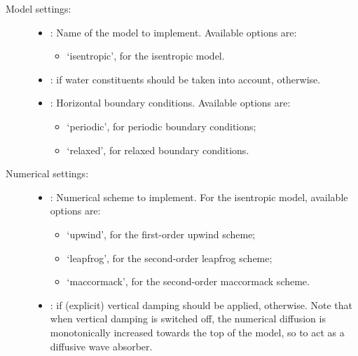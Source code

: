 \documentclass[letterpaper,10pt,english]{sphinxmanual}
\begin{document}
\begin{description}
\begin{itemize}
\end{itemize}

\item[{Model settings:}] \leavevmode\begin{itemize}
\item {} 
: Name of the model to implement. Available options are:
\begin{itemize}
\item {} 
‘isentropic’, for the isentropic model.

\end{itemize}

\item {} 
:  if water constituents should be taken into account,  otherwise.

\item {} 
: Horizontal boundary conditions. Available options are:
\begin{itemize}
\item {} 
‘periodic’, for periodic boundary conditions;

\item {} 
‘relaxed’, for relaxed boundary conditions.

\end{itemize}

\end{itemize}

\item[{Numerical settings:}] \leavevmode\begin{itemize}
\item {} 
: Numerical scheme to implement. For the isentropic model, available options are:
\begin{itemize}
\item {} 
‘upwind’, for the first-order upwind scheme;

\item {} 
‘leapfrog’, for the second-order leapfrog scheme;

\item {} 
‘maccormack’, for the second-order maccormack scheme.

\end{itemize}

\item {} 
:  if (explicit) vertical damping should be applied,  otherwise.               Note that when vertical damping is switched off, the numerical diffusion is monotonically increased towards             the top of the model, so to act as a diffusive wave absorber.


\end{itemize}
\end{description}
\end{document}
